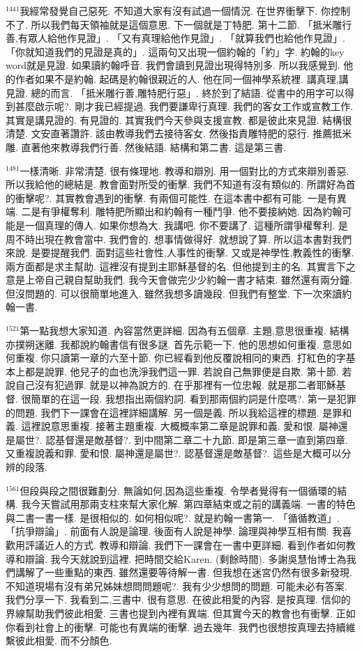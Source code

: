 \documentclass{book}
\begin{document}
$^{1441}$我經常發覺自己惡死.
不知道大家有沒有試過一個情況.
在世界衝擊下.
你控制不了.
所以我們每天領袖就是這個意思.
下一個就是丁特肥.
第十二節.
「抵米雕行善,有眾人給他作見證」.
「又有真理給他作見證」.
「就算我們也給他作見證」.
「你就知道我們的見證是真的」.
這兩句又出現一個約翰的「約」字.
約翰的key word就是見證.
如果讀約翰呼音.
我們會讀到見證出現得特別多.
所以我感覺到.
他的作者如果不是約翰.
起碼是約翰很親近的人.
他在同一個神學系統裡.
講真理,講見證.
總的而言.
「抵米雕行善,雕特肥行惡」.
終於到了結語.
從書中的用字可以得到甚麼啟示呢?.
剛才我已經提過.
我們要謙卑行真理.
我們的客女工作或宣教工作.
其實是講見證的.
有見證的.
其實我們今天參與支援宣教.
都是彼此來見證.
結構很清楚.
文安直著讚許.
該由教導我們去接待客女.
然後指責雕特肥的惡行.
推薦抵米雕.
直著他來教導我們行善.
然後結語.
結構和第二書.
這是第三書.

$^{1481}$一樣清晰.
非常清楚.
很有條理地.
教導和辯別.
用一個對比的方式來辯別善惡.
所以我給他的總結是.
教會面對所受的衝擊.
我們不知道有沒有類似的.
所謂好為首的衝擊呢?.
其實教會遇到的衝擊.
有兩個可能性.
在這本書中都有可能.
一是有異端.
二是有爭權奪利.
雕特肥所顯出和約翰有一種鬥爭.
他不要接納她.
因為約翰可能是一個真理的傳人.
如果你想為大.
我講吧.
你不要講了.
這種所謂爭權奪利.
是周不時出現在教會當中.
我們會的.
想事情做得好.
就想說了算.
所以這本書對我們來說.
是要提醒我們.
面對這些社會性,人事性的衝擊.
又或是神學性,教義性的衝擊.
兩方面都是求主幫助.
這裡沒有提到主耶穌基督的名.
但他提到主的名.
其實言下之意是上帝自己親自幫助我們.
我今天會做完少少約翰一書才結束.
雖然還有兩分鐘.
但沒問題的.
可以很簡單地進入.
雖然我想多讀幾段.
但我們有整堂.
下一次來讀約翰一書.

$^{1521}$第一點我想大家知道.
內容當然更詳細.
因為有五個章.
主題,意思很重複.
結構亦撲朔迷離.
我都說約翰書信有很多謎.
首先示範一下.
他的思想如何重複.
意思如何重複.
你只讀第一章的六至十節.
你已經看到他反覆說相同的東西.
打紅色的字基本上都是說罪.
他兒子的血也洗淨我們這一罪.
若說自己無罪便是自欺.
第十節.
若說自己沒有犯過罪.
就是以神為說方的.
在乎那裡有一位忠報.
就是那二者耶穌基督.
很簡單的在這一段.
我想指出兩個約詞.
看到那兩個約詞是什麼嗎?.
第一是犯罪的問題.
我們下一課會在這裡詳細講解.
另一個是義.
所以我給這裡的標題.
是罪和義.
這裡說意思重複.
接著主題重複.
大概概率第二章是說罪和義.
愛和恨.
屬神還是屬世?.
認基督還是敵基督?.
到中間第二章二十九節.
即是第三章一直到第四章.
又重複說義和罪.
愛和恨.
屬神還是屬世?.
認基督還是敵基督?.
這些是大概可以分辨的段落.

$^{1561}$但段與段之間很難劃分.
無論如何,因為這些重複.
令學者覺得有一個循環的結構.
我今天嘗試用那兩支柱來幫大家化解.
第四章結束或之前的講義端.
一書的特色與二書一書一樣.
是很相似的.
如何相似呢?.
就是約翰一書第一.
「循循教道」.
「抗爭辯論」.
前面有人說是論理.
後面有人說是神學.
論理與神學互相有關.
我喜歡用評議近人的方式.
教導和辯論.
我們下一課會在一書中更詳細.
看到作者如何教導和辯論.
我今天就說到這裡.
把時間交給Karen.
(剩餘時間).
多謝吳慧怡博士為我們講解了一些重點的東西.
雖然還要等待解一書.
但我想在迷宮仍然有很多新發現.
不知道現場有沒有弟兄姊妹想問問題呢?.
我有少少想問的問題.
可能未必有答案.
我們分享一下.
我看到二,三書中.
很有意思.
在彼此相愛的內容.
是按真理.
信仰的界線幫助我們彼此相愛.
三書也提到內裡有異端.
但其實今天的教會也有衝擊.
正如你看到社會上的衝擊.
可能也有異端的衝擊.
過去幾年.
我們也很想按真理去持續維繫彼此相愛.
而不分顏色.
\end{document}
